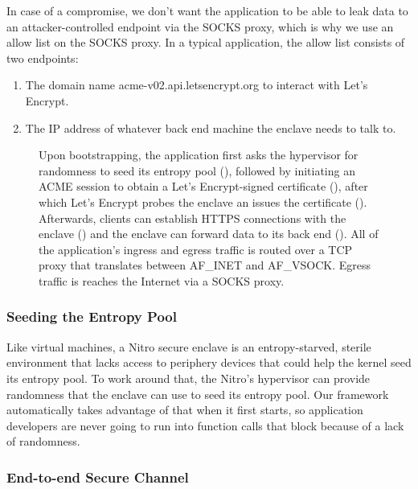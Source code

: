 In case of a compromise, we don't want the application to be able to leak data
to an attacker-controlled endpoint via the SOCKS proxy, which is why we use an
allow list on the SOCKS proxy.  In a typical application, the allow list
consists of two endpoints:

\begin{enumerate}
    \item The domain name acme-v02.api.letsencrypt.org to interact with Let's
      Encrypt.
    \item The IP address of whatever back end machine the enclave needs to talk
      to.
\end{enumerate}


\newcommand{\addr}[1]{{\footnotesize \color{gray}#1 }}

\begin{figure}[t]
\centering

\caption{Upon bootstrapping, the application first asks the hypervisor for
  randomness to seed its entropy pool (), followed by initiating an
  ACME session to obtain a Let's Encrypt-signed certificate (), after
  which Let's Encrypt probes the enclave an issues the certificate
  ().  Afterwards, clients can establish HTTPS connections with the
  enclave () and the enclave can forward data to its back end
  ().  All of the application's ingress and egress  traffic is routed
  over a TCP proxy that translates between AF\_INET and AF\_VSOCK.  Egress
  traffic is reaches the Internet via a SOCKS proxy.}
\label{fig:networking}
\end{figure}

\subsubsection{Seeding the Entropy Pool}
\label{sec:entropy}

Like virtual machines, a Nitro secure enclave is an entropy-starved, sterile
environment that lacks access to periphery devices that could help the kernel
seed its entropy pool.  To work around that, the Nitro's hypervisor can provide
randomness that the enclave can use to seed its entropy pool.  Our framework
automatically takes advantage of that when it first starts, so application
developers are never going to run into function calls that block because of a
lack of randomness.

\subsubsection{End-to-end Secure Channel}
\label{sec:cert}

